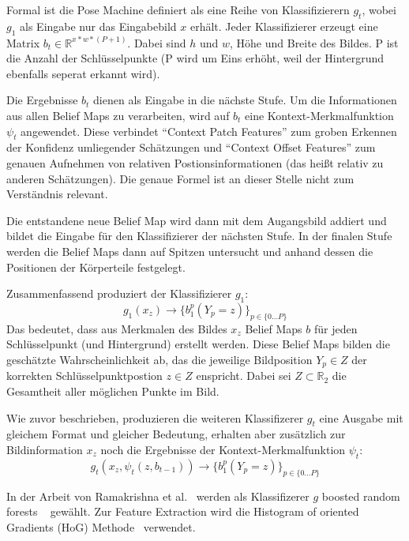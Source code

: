 \documentclass[journal, a4paper]{IEEEtran}
\begin{document}
        Formal ist die Pose Machine definiert als eine Reihe von Klassifizierern $g_t$, wobei $g_1$ als Eingabe nur das Eingabebild $x$ erhält. Jeder Klassifizierer erzeugt eine Matrix $b_{t}\in\mathbb{R}^{x*w*(P+1)}$. Dabei sind $h$ und $w$, Höhe und Breite des Bildes. P ist die Anzahl der Schlüsselpunkte (P wird um Eins erhöht, weil der Hintergrund ebenfalls seperat erkannt wird).

        Die Ergebnisse $b_t$ dienen als Eingabe in die nächste Stufe. 
        Um die Informationen aus allen Belief Maps zu verarbeiten, wird auf $b_t$ eine Kontext-Merkmalfunktion $\psi_t$ angewendet. Diese verbindet "`Context Patch Features"' zum groben Erkennen der Konfidenz umliegender Schätzungen und "`Context Offset Features"'  zum genauen Aufnehmen von relativen Postionsinformationen (das heißt relativ zu anderen Schätzungen). Die genaue Formel ist an dieser Stelle nicht zum Verständnis relevant. %

        Die entstandene neue Belief Map wird dann mit dem Augangsbild addiert und bildet die Eingabe für den Klassifizierer der nächsten Stufe. In der finalen Stufe werden die Belief Maps dann auf Spitzen untersucht und anhand dessen die Positionen der Körperteile festgelegt.

        Zusammenfassend produziert der Klassifizierer $g_1$:
        \[ g_1(x_z) \rightarrow \{b_{1}^{p}(Y_p = z) \}_{p \in \{0 \ldots P\}} \] 
        Das bedeutet, dass aus Merkmalen des Bildes $x_z$ Belief Maps $b$ für jeden Schlüsselpunkt (und Hintergrund) erstellt werden. Diese Belief Maps bilden die geschätzte Wahrscheinlichkeit ab, das die jeweilige Bildposition $Y_p \in Z$ der korrekten Schlüsselpunktpostion $z \in Z$ enspricht. Dabei sei $Z \subset \mathbb{R}_2$ die Gesamtheit aller möglichen Punkte im Bild.

        Wie zuvor beschrieben, produzieren die weiteren Klassifizerer $g_t$ eine Ausgabe mit gleichem Format und gleicher Bedeutung, erhalten aber zusätzlich zur Bildinformation $x_z$ noch die Ergebnisse der Kontext-Merkmalfunktion $\psi_t$:
        \[ g_t(x_z,\psi_t(z,b_{t-1})) \rightarrow \{b_{1}^{p}(Y_p = z) \}_{p \in \{0 \ldots P\}} \] 

        In der Arbeit von Ramakrishna et al.~\cite{ramakrishna2014pose} werden als Klassifizerer $g$ boosted random forests ~\cite{breiman2001,friedman2001greedy} gewählt. Zur Feature Extraction wird die Histogram of oriented Gradients (HoG) Methode~\cite{dalal2005histograms} verwendet.
\end{document}
